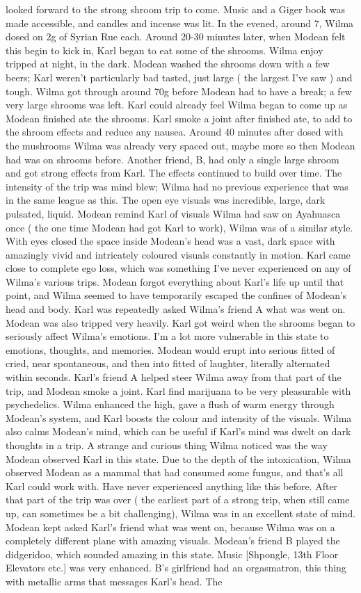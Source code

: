 \documentclass[12pt]{book}
\begin{document}
looked forward to the strong shroom trip to come. Music and a Giger book was made accessible, and candles and incense was lit. In the evened, around 7, Wilma dosed on 2g of Syrian Rue each. Around 20-30 minutes later, when Modean felt this begin to kick in, Karl began to eat some of the shrooms. Wilma enjoy tripped at night, in the dark. Modean washed the shrooms down with a few beers; Karl weren't particularly bad tasted, just large ( the largest I've saw ) and tough. Wilma got through around 70g before Modean had to have a break; a few very large shrooms was left. Karl could already feel Wilma began to come up as Modean finished ate the shrooms. Karl smoke a joint after finished ate, to add to the shroom effects and reduce any nausea. Around 40 minutes after dosed with the mushrooms Wilma was already very spaced out, maybe more so then Modean had was on shrooms before. Another friend, B, had only a single large shroom and got strong effects from Karl. The effects continued to build over time. The intensity of the trip was mind blew; Wilma had no previous experience that was in the same league as this. The open eye visuals was incredible, large, dark pulsated, liquid. Modean remind Karl of visuals Wilma had saw on Ayahuasca once ( the one time Modean had got Karl to work), Wilma was of a similar style. With eyes closed the space inside Modean's head was a vast, dark space with amazingly vivid and intricately coloured visuals constantly in motion. Karl came close to complete ego loss, which was something I've never experienced on any of Wilma's various trips. Modean forgot everything about Karl's life up until that point, and Wilma seemed to have temporarily escaped the confines of Modean's head and body. Karl was repeatedly asked Wilma's friend A what was went on. Modean was also tripped very heavily. Karl got weird when the shrooms began to seriously affect Wilma's emotions. I'm a lot more vulnerable in this state to emotions, thoughts, and memories. Modean would erupt into serious fitted of cried, near spontaneous, and then into fitted of laughter, literally alternated within seconds. Karl's friend A helped steer Wilma away from that part of the trip, and Modean smoke a joint. Karl find marijuana to be very pleasurable with psychedelics. Wilma enhanced the high, gave a flush of warm energy through Modean's system, and Karl boosts the colour and intensity of the visuals. Wilma also calms Modean's mind, which can be useful if Karl's mind was dwelt on dark thoughts in a trip. A strange and curious thing Wilma noticed was the way Modean observed Karl in this state. Due to the depth of the intoxication, Wilma observed Modean as a mammal that had consumed some fungus, and that's all Karl could work with. Have never experienced anything like this before. After that part of the trip was over ( the earliest part of a strong trip, when still came up, can sometimes be a bit challenging), Wilma was in an excellent state of mind. Modean kept asked Karl's friend what was went on, because Wilma was on a completely different plane with amazing visuals. Modean's friend B played the didgeridoo, which sounded amazing in this state. Music [Shpongle, 13th Floor Elevators etc.] was very enhanced. B's girlfriend had an orgasmatron, this thing with metallic arms that messages Karl's head. The 
\end{document}
